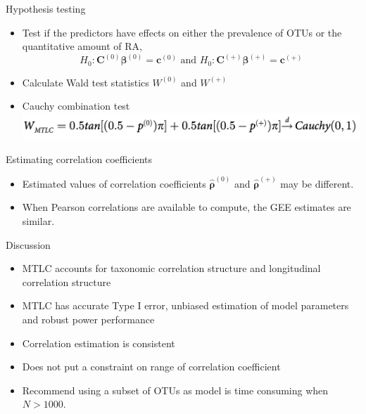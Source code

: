 \documentclass{beamer}
\begin{document}
\begin{frame}[t]{Hypothesis testing }
  \begin{itemize}
    \item Test if the predictors have effects on either the prevalence of OTUs or the quantitative amount of RA,
    $$H_0: \boldsymbol{C}^{(0)}\boldsymbol\beta^{(0)} = \boldsymbol{c}^{(0)} \text{ and } H_0: \boldsymbol{C}^{(+)}\boldsymbol\beta^{(+)} = \boldsymbol{c}^{(+)}$$
    \item Calculate Wald test statistics $W^{(0)}$ and $W^{(+)}$
    \item Cauchy combination test
    \includegraphics[width = \textwidth]{cauchy.png}
  \end{itemize}

\end{frame}

\begin{frame}[t]{Estimating correlation coefficients }
  \begin{itemize}
    \item Estimated values of correlation coefficients $\hat{\boldsymbol\rho}^{(0)}$ and $\hat{\boldsymbol\rho}^{(+)}$ may be different.
    \item When Pearson correlations are available to compute, the GEE estimates are similar.
  \end{itemize}
\end{frame}





\begin{frame}[t]{Discussion}
  \begin{itemize}
    \item MTLC accounts for taxonomic correlation structure and longitudinal correlation structure 
    \item MTLC has accurate Type I error, unbiased estimation of model parameters and robust power performance
    \item Correlation estimation is consistent
    \item Does not put a constraint on range of correlation coefficient
    \item Recommend using a subset of OTUs as model is time consuming when $N > 1000$.
  \end{itemize}
\end{frame}
\end{document}
